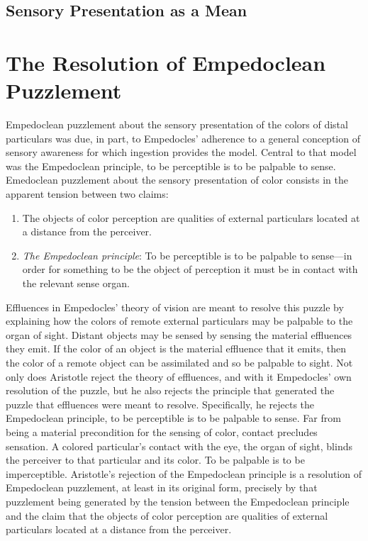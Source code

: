 \subsection{Sensory Presentation as a Mean} %
\label{sub:sensory_presentation_as_a_mean}



\section{The Resolution of Empedoclean Puzzlement} %
\label{sec:the_resolution_of_empedoclean_puzzlement}

Empedoclean puzzlement about the sensory presentation of the colors of distal particulars was due, in part, to Empedocles' adherence to a general conception of sensory awareness for which ingestion provides the model. Central to that model was the Empedoclean principle, to be perceptible is to be palpable to sense. Emedoclean puzzlement about the sensory presentation of color consists in the apparent tension between two claims:
\begin{enumerate}[(1)]
    \item The objects of color perception are qualities of external particulars located at a distance from the perceiver.
    \item \emph{The Empedoclean principle}: To be perceptible is to be palpable to sense---in order for something to be the object of perception it must be in contact with the relevant sense organ.
\end{enumerate}
Effluences in Empedocles' theory of vision are meant to resolve this puzzle by explaining how the colors of remote external particulars may be palpable to the organ of sight. Distant objects may be sensed by sensing the material effluences they emit. If the color of an object is the material effluence that it emits, then the color of a remote object can be assimilated and so be palpable to sight. Not only does Aristotle reject the theory of effluences, and with it Empedocles' own resolution of the puzzle, but he also rejects the principle that generated the puzzle that effluences were meant to resolve. Specifically, he rejects the Empedoclean principle, to be perceptible is to be palpable to sense. Far from being a material precondition for the sensing of color, contact precludes sensation. A colored particular's contact with the eye, the organ of sight, blinds the perceiver to that particular and its color. To be palpable is to be imperceptible. Aristotle's rejection of the Empedoclean principle is a resolution of Empedoclean puzzlement, at least in its original form, precisely by that puzzlement being generated by the tension between the Empedoclean principle and the claim that the objects of color perception are qualities of external particulars located at a distance from the perceiver.

